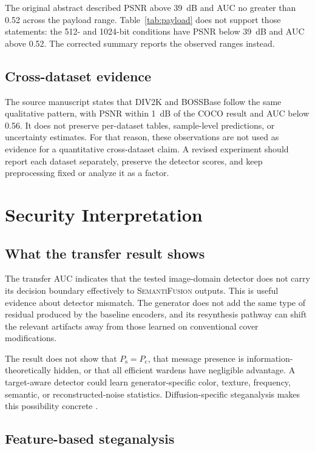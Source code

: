 \documentclass[pdflatex,sn-mathphys-num]{sn-jnl}
\newcommand{\method}{\textsc{SemantiFusion}}
\begin{document}
The original abstract described PSNR above 39~dB and AUC no greater than 0.52 across the payload range. Table~\ref{tab:payload} does not support those statements: the 512- and 1024-bit conditions have PSNR below 39~dB and AUC above 0.52. The corrected summary reports the observed ranges instead.

\subsection{Cross-dataset evidence}

The source manuscript states that DIV2K and BOSSBase follow the same qualitative pattern, with PSNR within 1~dB of the COCO result and AUC below 0.56. It does not preserve per-dataset tables, sample-level predictions, or uncertainty estimates. For that reason, these observations are not used as evidence for a quantitative cross-dataset claim. A revised experiment should report each dataset separately, preserve the detector scores, and keep preprocessing fixed or analyze it as a factor.

\section{Security Interpretation}
\label{sec:security}

\subsection{What the transfer result shows}

The transfer AUC indicates that the tested image-domain detector does not carry its decision boundary effectively to \method{} outputs. This is useful evidence about detector mismatch. The generator does not add the same type of residual produced by the baseline encoders, and its resynthesis pathway can shift the relevant artifacts away from those learned on conventional cover modifications.

The result does not show that $P_{\mathrm{s}}=P_{\mathrm{c}}$, that message presence is information-theoretically hidden, or that all efficient wardens have negligible advantage. A target-aware detector could learn generator-specific color, texture, frequency, semantic, or reconstructed-noise statistics. Diffusion-specific steganalysis makes this possibility concrete \cite{zhu2026rethinking}.

\subsection{Feature-based steganalysis}
\end{document}
